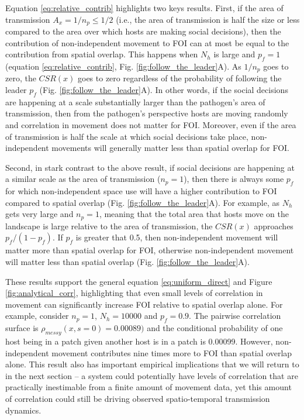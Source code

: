 \documentclass[letterpaper]{article}
\begin{document}
Equation \ref{eq:relative_contrib} highlights two keys results.  First, if the area of transmission $A_x = 1 / n_p \leq 1 / 2$ (i.e., the area of transmission is half the size or less compared to the area over which hosts are making social decisions), then the contribution of non-independent movement to FOI can at most be equal to the contribution from spatial overlap. This happens when $N_h$ is large and $p_f = 1$ (equation \ref{eq:relative_contrib}, Fig. \ref{fig:follow_the_leader}A). As $1 / n_p$ goes to zero, the $CSR(x)$ goes to zero regardless of the probability of following the leader $p_f$ (Fig. \ref{fig:follow_the_leader}A). In other words, if the social decisions are happening at a scale substantially larger than the pathogen's area of transmission, then from the pathogen's perspective hosts are moving randomly and correlation in movement does not matter for FOI.  Moreover, even if the area of transmission is half the scale at which social decisions take place, non-independent movements will generally matter less than spatial overlap for FOI. 

Second, in stark contrast to the above result, if social decisions are happening at a similar scale as the area of transmission ($n_p = 1$), then there is always some $p_f$ for which non-independent space use will have a higher contribution to FOI compared to spatial overlap (Fig. \ref{fig:follow_the_leader}A).  For example, as $N_h$ gets very large and $n_p = 1$, meaning that the total area that hosts move on the landscape is large relative to the area of transmission, the $CSR(x)$ approaches $p_f / (1 - p_f)$. If $p_f$ is greater that 0.5, then non-independent movement will matter more than spatial overlap for FOI, otherwise non-independent movement will matter less than spatial overlap (Fig. \ref{fig:follow_the_leader}A). 

These results support the general equation \ref{eq:uniform_direct} and Figure \ref{fig:analytical_corr}, highlighting that even small levels of correlation in movement can significantly increase FOI relative to spatial overlap alone. For example, consider $n_p = 1$, $N_h = 10000$ and $p_f = 0.9$.  The pairwise correlation surface is $\rho_{messy}(x, s=0) = 0.00089)$ and the conditional probability of one host being in a patch given another host is in a patch is 0.00099. However, non-independent movement contributes nine times more to FOI than spatial overlap alone.  This result also has important empirical implications that we will return to in the next section -- a system could potentially have levels of correlation that are practically inestimable from a finite amount of movement data, yet this amount of correlation could still be driving observed spatio-temporal transmission dynamics.
\end{document}
